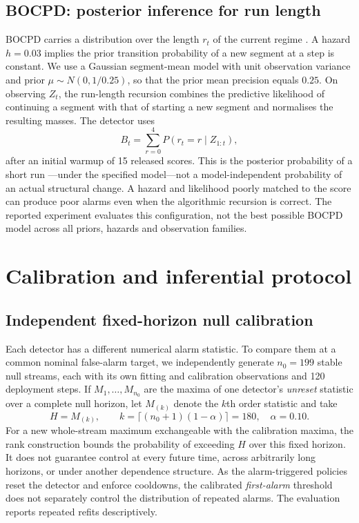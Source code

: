 \documentclass[11pt,a4paper]{article}
\begin{document}
\subsection{BOCPD: posterior inference for run length}
BOCPD carries a distribution over the length $r_t$ of the current regime \cite{adams2007}. A hazard $h=0.03$ implies the prior transition probability of a new segment at a step is constant. We use a Gaussian segment-mean model with unit observation variance and prior $\mu\sim N(0,1/0.25)$, so that the prior mean precision equals $0.25$. On observing $Z_t$, the run-length recursion combines the predictive likelihood of continuing a segment with that of starting a new segment and normalises the resulting masses. The detector uses
\begin{equation}\label{eq:bocpd}
 B_t=\sum_{r=0}^{4}P(r_t=r\mid Z_{1:t}),
\end{equation}
after an initial warmup of 15 released scores. This is the posterior probability of a short run ---under the specified model---not a model-independent probability of an actual structural change. A hazard and likelihood poorly matched to the score can produce poor alarms even when the algorithmic recursion is correct. The reported experiment evaluates this configuration, not the best possible BOCPD model across all priors, hazards and observation families.

\section{Calibration and inferential protocol}\label{sec:inference}
\subsection{Independent fixed-horizon null calibration}
Each detector has a different numerical alarm statistic. To compare them at a common nominal false-alarm target, we independently generate $n_0=199$ stable null streams, each with its own fitting and calibration observations and 120 deployment steps. If $M_{1},\ldots,M_{n_0}$ are the maxima of one detector's \emph{unreset} statistic over a complete null horizon, let $M_{(k)}$ denote the $k$th order statistic and take
\begin{equation}\label{eq:order}
 H=M_{(k)},\qquad k=\lceil(n_0+1)(1-\alpha)\rceil=180,\quad\alpha=0.10.
\end{equation}
For a new whole-stream maximum exchangeable with the calibration maxima, the rank construction bounds the probability of exceeding $H$ over this fixed horizon. It does not guarantee control at every future time, across arbitrarily long horizons, or under another dependence structure. As the alarm-triggered policies reset the detector and enforce cooldowns, the calibrated \emph{first-alarm} threshold does not separately control the distribution of repeated alarms. The evaluation reports repeated refits descriptively.
\end{document}
